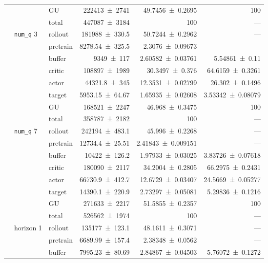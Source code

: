 {\begin{longtable}{@{}lllrrr@{}}
     &  & GU & \num{222413+-2741} & \num{49.7456+-0.2695} & 100 \\
     &  & total & \num{447087+-3184} & \num{100} & --- \\
    \addlinespace[2pt]
     & \texttt{num\_\allowbreak q} 3 & rollout & \num{181988+-330.5} & \num{50.7244+-0.2962} & --- \\
     &  & pretrain & \num{8278.54+-325.5} & \num{2.3076+-0.09673} & --- \\
     &  & buffer & \num{9349+-117} & \num{2.60582+-0.03761} & \num{5.54861+-0.11} \\
     &  & critic & \num{108897+-1989} & \num{30.3497+-0.376} & \num{64.6159+-0.3261} \\
     &  & actor & \num{44321.8+-345} & \num{12.3531+-0.02799} & \num{26.302+-0.1496} \\
     &  & target & \num{5953.15+-64.67} & \num{1.65935+-0.02608} & \num{3.53342+-0.08079} \\
     &  & GU & \num{168521+-2247} & \num{46.968+-0.3475} & 100 \\
     &  & total & \num{358787+-2182} & \num{100} & --- \\
    \addlinespace[2pt]
     & \texttt{num\_\allowbreak q} 7 & rollout & \num{242194+-483.1} & \num{45.996+-0.2268} & --- \\
     &  & pretrain & \num{12734.4+-25.51} & \num{2.41843+-0.009151} & --- \\
     &  & buffer & \num{10422+-126.2} & \num{1.97933+-0.03025} & \num{3.83726+-0.07618} \\
     &  & critic & \num{180090+-2117} & \num{34.2004+-0.2805} & \num{66.2975+-0.2431} \\
     &  & actor & \num{66730.9+-412.7} & \num{12.6729+-0.03407} & \num{24.5669+-0.05277} \\
     &  & target & \num{14390.1+-220.9} & \num{2.73297+-0.05081} & \num{5.29836+-0.1216} \\
     &  & GU & \num{271633+-2217} & \num{51.5855+-0.2357} & 100 \\
     &  & total & \num{526562+-1974} & \num{100} & --- \\
    \addlinespace[2pt]
     & horizon 1 & rollout & \num{135177+-123.1} & \num{48.1611+-0.3071} & --- \\
     &  & pretrain & \num{6689.99+-157.4} & \num{2.38348+-0.0562} & --- \\
     &  & buffer & \num{7995.23+-80.69} & \num{2.84867+-0.04503} & \num{5.76072+-0.1272} \\

\end{longtable}}
